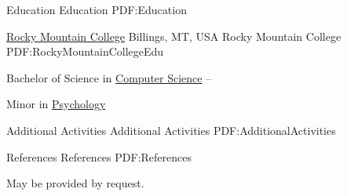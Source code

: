\documentclass[letterpaper,MMMyyyy,nonstopmode]{simpleresumecv}
\begin{document}
\begin{Body}
\Section
{Education}
{Education}
{PDF:Education}

\SubSection
{\href{http://www.rocky.edu/}
{Rocky Mountain College}
\hfill Billings, MT, USA}
{Rocky Mountain College}
{PDF:RockyMountainCollegeEdu}

\Entry
Bachelor of Science in
\href{http://cs.rocky.edu/}
{Computer Science}
\hfill
{} --
\begin{Detail}
\BulletItem
Minor in 
\href{http://rocky.edu/academics/academic-programs/undergraduate-majors/psychology/}
{Psychology}
\end{Detail}


\Section
{Additional \newline Activities}
{Additional Activities}
{PDF:AdditionalActivities}


\Section
{References}
{References}
{PDF:References}

May be provided by request.

\end{Body}
\end{document}
